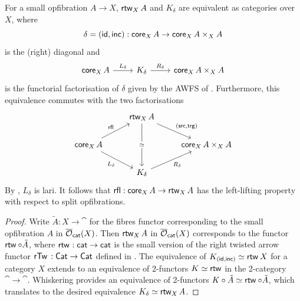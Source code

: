 \begin{proposition}\label{prop:rtw-equiv-K}
  For a small opfibration $A \to X$,
  $\rtw[X]{A}$ and $K_\delta$ are equivalent as categories over $X$,
  where
  \[\delta = (\id,\inc) : \vCore[X]{A} \to \vCore[X]{A} \times_X A\] is the
  (right) diagonal and
  \[\begin{tikzcd}
    {\vCore[X]{A}} & {K_\delta} & {\vCore[X]{A} \times_X A}
    \arrow["{L_\delta}", from=1-1, to=1-2]
    \arrow["{R_\delta}", from=1-2, to=1-3]
  \end{tikzcd} \]
  is the functorial factorisation of $\delta$ given by the AWFS of
  .
  Furthermore, this equivalence commutes with the two factorisations
  \[ \begin{tikzcd}
    & {\rtw[X]{A}} & \\
    {\vCore[X]{A}} && {\vCore[X]{A} \times_X A} \\
    & {K_\delta}
    \arrow["{(\src,\trg)}", from=1-2, to=2-3]
    \arrow["\simeq"{description}, from=1-2, to=3-2]
    \arrow["\rfl", from=2-1, to=1-2]
    \arrow["{L_\delta}"', from=2-1, to=3-2]
    \arrow["{R_\delta}"', from=3-2, to=2-3]
  \end{tikzcd}\]
  By , $L_\delta$ is lari.
  It follows that $\rfl : \vCore[X]{A} \to \rtw[X]{A}$
  has the left-lifting property with respect to
  split opfibrations.
\end{proposition}
\begin{proof}
  Write $\tilde{A} : X \to \cat$ for the fibres functor corresponding to
  the small opfibration $A$ in $\smlopfib(X)$.
  Then $\rtw[X]{A}$ in $\smlopfib(X)$ corresponds to the functor
  $\rtw{} \circ \tilde{A}$,
  where $\rtw{} : \cat \to \cat$ is the small version of the
  right twisted arrow functor $\rTw{} : \Cat \to \Cat$
  defined in .
  The equivalence of $K_{(\id,\inc)} \simeq \rtw{X}$ for a category $X$
  extends to an equivalence of 2-functors $K \simeq \rtw{}$
  in the 2-category $\cat \to \cat$.
  Whiskering provides an equivalence of 2-functors
  $K \circ \tilde{A} \simeq \rtw{} \circ \tilde{A}$,
  which translates to the desired equivalence $K_\delta \simeq \rtw[X]{A}$.
\end{proof}